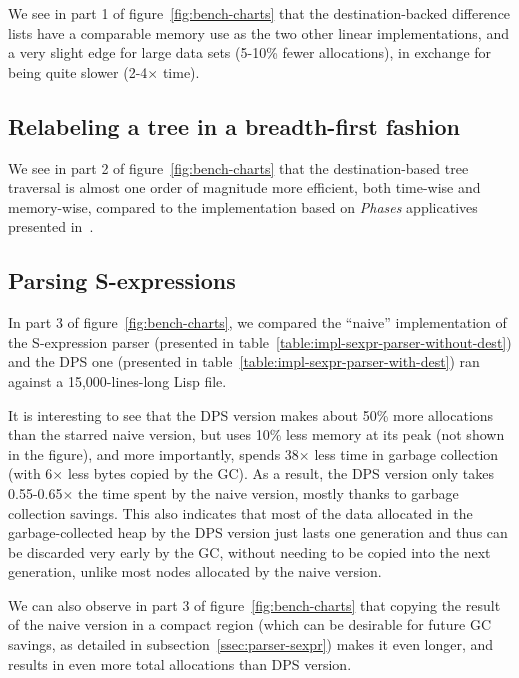 \documentclass[english]{jflart}
\begin{document}
We see in part 1 of figure~\ref{fig:bench-charts} that the destination-backed difference lists have a comparable memory use as the two other linear implementations, and a very slight edge for large data sets (5-10\% fewer allocations), in exchange for being quite slower (2-4$\times$ time).


\subsection{Relabeling a tree in a breadth-first fashion}\label{ssec:benchmark-bf-tree-traversal}

We see in part 2 of figure~\ref{fig:bench-charts} that the destination-based tree traversal is almost one order of magnitude more efficient, both time-wise and memory-wise, compared to the implementation based on \emph{Phases} applicatives presented in~\cite{gibbons_phases_2023}.

\subsection{Parsing S-expressions}\label{ssec:benchmark-parser}

In part 3 of figure~\ref{fig:bench-charts}, we compared the ``naive'' implementation of the S-expression parser (presented in table~\ref{table:impl-sexpr-parser-without-dest}) and the DPS one (presented in table~\ref{table:impl-sexpr-parser-with-dest}) ran against a 15,000-lines-long Lisp file.

It is interesting to see that the DPS version makes about 50\% more allocations than the starred naive version, but uses 10\% less memory at its peak (not shown in the figure), and more importantly, spends 38$\times$ less time in garbage collection (with 6$\times$ less bytes copied by the GC). As a result, the DPS version only takes 0.55-0.65$\times$ the time spent by the naive version, mostly thanks to garbage collection savings. This also indicates that most of the data allocated in the garbage-collected heap by the DPS version just lasts one generation and thus can be discarded very early by the GC, without needing to be copied into the next generation, unlike most nodes allocated by the naive version.

We can also observe in part 3 of figure~\ref{fig:bench-charts} that copying the result of the naive version in a compact region (which can be desirable for future GC savings, as detailed in subsection~\ref{ssec:parser-sexpr}) makes it even longer, and results in even more total allocations than DPS version.
\end{document}
